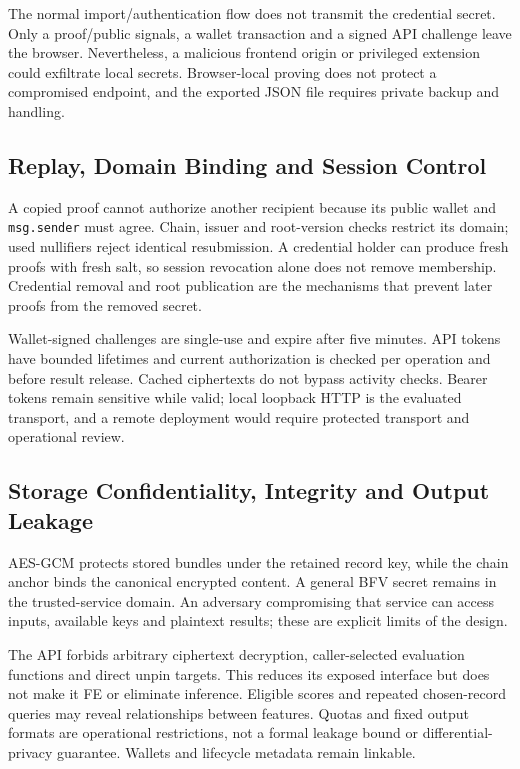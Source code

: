 \documentclass[10pt,twocolumn,a4paper]{article}
\newcommand{\code}[1]{\texttt{#1}}
\begin{document}
The normal import/authentication flow does not transmit the credential secret.
Only a proof/public signals, a wallet transaction and a signed API challenge leave
the browser. Nevertheless, a malicious frontend origin or privileged extension
could exfiltrate local secrets. Browser-local proving does not protect a compromised
endpoint, and the exported JSON file requires private backup and handling.

\subsection{Replay, Domain Binding and Session Control}
A copied proof cannot authorize another recipient because its public wallet and
\code{msg.sender} must agree. Chain, issuer and root-version checks restrict its
domain; used nullifiers reject identical resubmission. A credential holder can
produce fresh proofs with fresh salt, so session revocation alone does not remove
membership. Credential removal and root publication are the mechanisms that prevent
later proofs from the removed secret.

Wallet-signed challenges are single-use and expire after five minutes. API tokens
have bounded lifetimes and current authorization is checked per operation and
before result release. Cached ciphertexts do not bypass activity checks. Bearer
tokens remain sensitive while valid; local loopback HTTP is the evaluated transport,
and a remote deployment would require protected transport and operational review.

\subsection{Storage Confidentiality, Integrity and Output Leakage}
AES-GCM protects stored bundles under the retained record key, while the chain
anchor binds the canonical encrypted content. A general BFV secret remains in the
trusted-service domain. An adversary compromising that service can access inputs,
available keys and plaintext results; these are explicit limits of the design.

The API forbids arbitrary ciphertext decryption, caller-selected evaluation
functions and direct unpin targets. This reduces its exposed interface but does
not make it FE or eliminate inference. Eligible scores and repeated chosen-record
queries may reveal relationships between features. Quotas and fixed output formats
are operational restrictions, not a formal leakage bound or differential-privacy
guarantee. Wallets and lifecycle metadata remain linkable.
\end{document}
